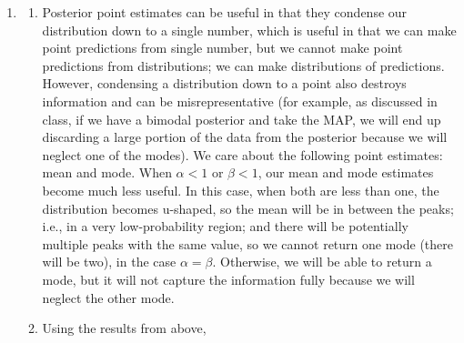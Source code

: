 \documentclass[submit]{harvardml}
\newenvironment{ans}{
  \begin{enumerate}
  \color{blue}
}{
  \end{enumerate}
  \color{black}
}
\begin{document}
\begin{ans}
\begin{enumerate}
\begin{enumerate}
        $$
        \frac{\mu(1 - \mu)}{\alpha + \beta + 1}
        $$
        \end{enumerate}
        Beta(1, 1) corresponds to a Uniform distribution from 0 to 1. If we scale $\alpha$ and $\beta$, very informally, we get that lower $\alpha$ makes the distribution have a higher PDF value towards the left and higher $\beta$ makes it have higher PDF values towards the right. Higher values for both correspond to a more hump-shaped/normal-looking distribution, and lower values for both mean the distribution is more U-shaped (i.e., the PDF has higher value near to 0 and 1). Finally, higher values for either correspond to steeper curves. 
        \item We can verify Beta-Binomial Conjugacy by plugging in for the posterior, which is proportional to likelihood times prior:
        $$
        (\theta^y(1 - \theta)^{N - y}) \cdot (\theta^{\alpha - 1}(1 - \theta)^{\beta - 1}) = \theta(y + \alpha - 1)(1 - \theta)^{\beta + N - y - 1}
        $$
        Thus, we can pattern-match this to a Beta$(y + \alpha, \beta + N - y)$ distribution.         
    \end{enumerate}
    \item
    \begin{enumerate}
        \item Posterior point estimates can be useful in that they condense our distribution down to a single number, which is useful in that we can make point predictions from single number, but we cannot make point predictions from distributions; we can make distributions of predictions. However, condensing a distribution down to a point also destroys information and can be misrepresentative (for example, as discussed in class, if we have a bimodal posterior and take the MAP, we will end up discarding a large portion of the data from the posterior because we will neglect one of the modes). We care about the following point estimates: mean and mode. 
        When $\alpha < 1$ or $ \beta < 1$, our mean and mode estimates become much less useful. In this case, when both are less than one, the distribution becomes u-shaped, so the mean will be in between the peaks; i.e., in a very low-probability region; and there will be potentially multiple peaks with the same value, so we cannot return one mode (there will be two), in the case $\alpha = \beta$. Otherwise, we will be able to return a mode, but it will not capture the information fully because we will neglect the other mode. 
        \item Using the results from above, 

\end{enumerate}
\end{ans}
\end{document}
